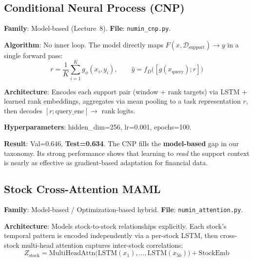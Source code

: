 \documentclass[11pt,a4paper]{article}
\begin{document}
\subsection{Conditional Neural Process (CNP)~\cite{garnelo2018}}

\textbf{Family}: Model-based (Lecture~8). \textbf{File}: \texttt{numin\_cnp.py}.

\textbf{Algorithm}: No inner loop. The model directly maps $F(x, \mathcal{D}_{\text{support}}) \to y$ in a single forward pass:
\begin{equation}
  r = \frac{1}{K}\sum_{i=1}^{K} g_\phi(x_i, y_i), \qquad \hat{y} = f_D\bigl([g(x_{\text{query}}); r]\bigr)
\end{equation}

\textbf{Architecture}: Encodes each support pair (window + rank targets) via LSTM + learned rank embeddings, aggregates via mean pooling to a task representation $r$, then decodes $[r; \text{query\_enc}] \to$ rank logits.

\textbf{Hyperparameters}: hidden\_dim=256, lr=0.001, epochs=100.

\textbf{Result}: Val=0.646, \textbf{Test=0.634}. The CNP fills the \textbf{model-based} gap in our taxonomy. Its strong performance shows that learning to \emph{read} the support context is nearly as effective as gradient-based adaptation for financial data.

\subsection{Stock Cross-Attention MAML}

\textbf{Family}: Model-based / Optimization-based hybrid. \textbf{File}: \texttt{numin\_attention.py}.

\textbf{Architecture}: Models stock-to-stock relationships explicitly. Each stock's temporal pattern is encoded independently via a per-stock LSTM, then cross-stock multi-head attention captures inter-stock correlations:
\begin{equation}
  Z_{\text{stock}} = \text{MultiHeadAttn}\bigl(\text{LSTM}(x_1), \ldots, \text{LSTM}(x_{50})\bigr) + \text{StockEmb}
\end{equation}
\end{document}
